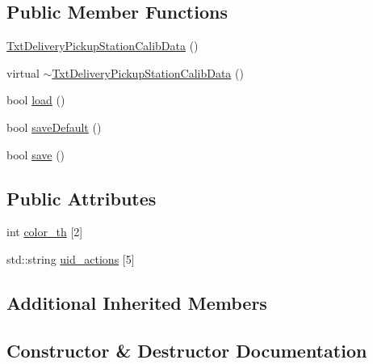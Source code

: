 \subsection*{Public Member Functions}
\begin{DoxyCompactItemize}
\item 
\hyperlink{classft_1_1_txt_delivery_pickup_station_calib_data_a7fe31c3fdbb44a72554a2fcdc9eec91e}{Txt\+Delivery\+Pickup\+Station\+Calib\+Data} ()
\item 
virtual \hyperlink{classft_1_1_txt_delivery_pickup_station_calib_data_a1411ad906d5fb22c0e025cdff543b594}{$\sim$\+Txt\+Delivery\+Pickup\+Station\+Calib\+Data} ()
\item 
bool \hyperlink{classft_1_1_txt_delivery_pickup_station_calib_data_a6bb1679754a7cb50ef455a0b1241c08a}{load} ()
\item 
bool \hyperlink{classft_1_1_txt_delivery_pickup_station_calib_data_a1cf9b3eb2a58d76ef84de23021c4e3bb}{save\+Default} ()
\item 
bool \hyperlink{classft_1_1_txt_delivery_pickup_station_calib_data_a0d4f07c8ccbb254d8bc1d2b431790717}{save} ()
\end{DoxyCompactItemize}
\subsection*{Public Attributes}
\begin{DoxyCompactItemize}
\item 
int \hyperlink{classft_1_1_txt_delivery_pickup_station_calib_data_a35809cf5b3c77bbcbf2c36c7905d286f}{color\+\_\+th} \mbox{[}2\mbox{]}
\item 
std\+::string \hyperlink{classft_1_1_txt_delivery_pickup_station_calib_data_a4cd1ea7a4ffc6e5a66d7cab90be86bb0}{uid\+\_\+actions} \mbox{[}5\mbox{]}
\end{DoxyCompactItemize}
\subsection*{Additional Inherited Members}


\subsection{Constructor \& Destructor Documentation}
